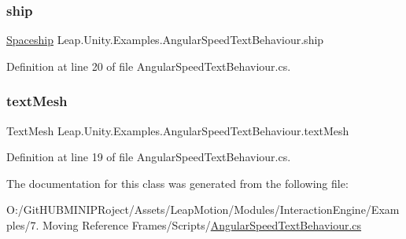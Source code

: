 \subsubsection{\texorpdfstring{ship}{ship}}
{\footnotesize\ttfamily \mbox{\hyperlink{class_leap_1_1_unity_1_1_examples_1_1_spaceship}{Spaceship}} Leap.\+Unity.\+Examples.\+Angular\+Speed\+Text\+Behaviour.\+ship}



Definition at line 20 of file Angular\+Speed\+Text\+Behaviour.\+cs.

\mbox{\label{class_leap_1_1_unity_1_1_examples_1_1_angular_speed_text_behaviour_aa5635b2d39d518f283043b6318dd2cfc}} 
\subsubsection{\texorpdfstring{textMesh}{textMesh}}
{\footnotesize\ttfamily Text\+Mesh Leap.\+Unity.\+Examples.\+Angular\+Speed\+Text\+Behaviour.\+text\+Mesh}



Definition at line 19 of file Angular\+Speed\+Text\+Behaviour.\+cs.



The documentation for this class was generated from the following file\+:\begin{DoxyCompactItemize}
\item 
O\+:/\+Git\+H\+U\+B\+M\+I\+N\+I\+P\+Roject/\+Assets/\+Leap\+Motion/\+Modules/\+Interaction\+Engine/\+Examples/7. Moving Reference Frames/\+Scripts/\mbox{\hyperlink{_angular_speed_text_behaviour_8cs}{Angular\+Speed\+Text\+Behaviour.\+cs}}\end{DoxyCompactItemize}
